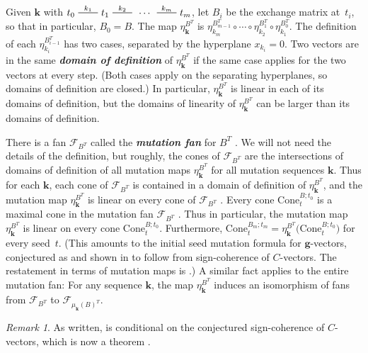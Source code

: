 \documentclass{amsart}
\theoremstyle{definition}
\theoremstyle{remark}
\newtheorem{remark}[proposition]{Remark}
\numberwithin{equation}{section}
\newcommand{\newword}[1]{\textbf{\emph{#1}}}
\newcommand{\edge}{\,\,\rule[2.7pt]{20pt}{0.5pt}\,\,}
\newcommand{\F}{{\mathcal F}}
\newcommand{\0}{{\mathbf{0}}}
\newcommand{\Cone}{\mathrm{Cone}}
\newcommand{\g}{\mathbf{g}}
\newcommand{\kk}{{\boldsymbol{k}}}
\begin{document}
Given $\kk$ with $t_0\overset{k_1}{\edge}t_1\overset{k_2}{\edge}\,\cdots\,\overset{k_m}{\edge}t_m$, let $B_i$ be the exchange matrix at~$t_i$, so that in particular, $B_0=B$.
The map $\eta_{\kk}^{B^T}$ is ${\eta_{k_m}^{B_{m-1}^T}\circ\cdots\circ\eta_{k_2}^{B_1^T}\circ\eta_{k_1}^{B_0^T}}$.
The definition of each $\eta_{k_i}^{B_{i-1}^T}$ has two cases, separated by the hyperplane $x_{k_i}=0$.
Two vectors are in the same \newword{domain of definition} of $\eta_\kk^{B^T}$ if the same case applies for the two vectors at every step.
(Both cases apply on the separating hyperplanes, so domains of definition are closed.)
In particular, $\eta_\kk^{B^T}$ is linear in each of its domains of definition, but the domains of linearity of $\eta_\kk^{B^T}$ can be larger than its domains of definition.

There is a fan $\F_{B^T}$ called the \newword{mutation fan} for $B^T$ \cite[Definition~5.12]{universal}.
We will not need the details of the definition, but roughly, the cones of $\F_{B^T}$ are the intersections of domains of definition of all mutation maps $\eta_\kk^{B^T}$ for all mutation sequences $\kk$.
Thus for each $\kk$, each cone of $\F_{B^T}$ is contained in a domain of definition of $\eta_\kk^{B^T}$, and the mutation map $\eta_\kk^{B^T}$ is linear on every cone of $\F_{B^T}$ \cite[Proposition~5.3]{universal}.
Every cone $\Cone^{B;t_0}_t$ is a maximal cone in the mutation fan $\F_{B^T}$ \cite[Proposition~8.13]{universal}.
Thus in particular, the mutation map $\eta_\kk^{B^T}$ is linear on every cone $\Cone^{B;t_0}_t$.
Furthermore, $\Cone_t^{B_m;t_m}=\eta_\kk^{B^T}\bigl(\Cone_t^{B;t_0}\bigr)$ for every seed~$t$.
(This amounts to the initial seed mutation formula for $\g$-vectors, conjectured as \cite[Conjecture~7.12]{ca4} and shown in \cite[Proposition~4.2(v)]{NZ} to follow from sign-coherence of $C$-vectors.
The restatement in terms of mutation maps is \cite[Conjecture~8.11]{universal}.)
A similar fact applies to the entire mutation fan:
For any sequence $\kk$, the map $\eta_\kk^{B^T}$ induces an isomorphism of fans \cite[Proposition~7.3]{universal} from $\F_{B^T}$ to $\F_{\mu_\kk(B)^T}$.

\begin{remark}\label{conditional}
As written, \cite[Proposition~8.13]{universal} is conditional on the conjectured sign-coherence of $C$-vectors, which is now a theorem \cite[Corollary~5.5]{GHKK}.
\end{remark}
\end{document}
